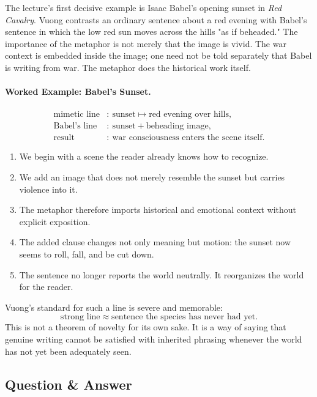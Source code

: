 The lecture's first decisive example is Isaac Babel's opening sunset in \textit{Red Cavalry}. Vuong contrasts an ordinary sentence about a red evening with Babel's sentence in which the low red sun moves across the hills "as if beheaded." The importance of the metaphor is not merely that the image is vivid. The war context is embedded inside the image; one need not be told separately that Babel is writing from war. The metaphor does the historical work itself.

\paragraph{Worked Example: Babel's Sunset.}
\begin{align}
\text{mimetic line} &:\ \text{sunset} \mapsto \text{red evening over hills},\\
\text{Babel's line} &:\ \text{sunset} + \text{beheading image},\\
\text{result} &:\ \text{war consciousness enters the scene itself}.
\end{align}
\begin{enumerate}
\item We begin with a scene the reader already knows how to recognize.
\item We add an image that does not merely resemble the sunset but carries violence into it.
\item The metaphor therefore imports historical and emotional context without explicit exposition.
\item The added clause changes not only meaning but motion: the sunset now seems to roll, fall, and be cut down.
\item The sentence no longer reports the world neutrally. It reorganizes the world for the reader.
\end{enumerate}

Vuong's standard for such a line is severe and memorable:
\begin{equation}
\text{strong line} \approx \text{sentence the species has never had yet}.
\end{equation}
This is not a theorem of novelty for its own sake. It is a way of saying that genuine writing cannot be satisfied with inherited phrasing whenever the world has not yet been adequately seen.

\subsection{Question \& Answer}


